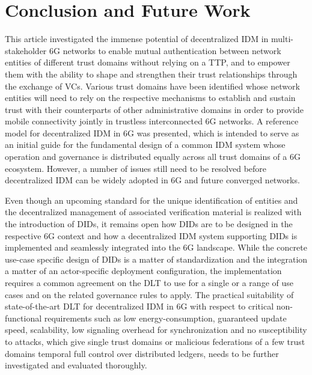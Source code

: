 \documentclass[conference]{IEEEtran}
\begin{document}
\section{Conclusion and Future Work}
\label{conclusion}

This article investigated the immense potential of decentralized IDM in multi-stakeholder 6G networks to enable mutual authentication between network entities of different trust domains without relying on a TTP, and to empower them with the ability to shape and strengthen their trust relationships through the exchange of VCs. Various trust domains have been identified whose network entities will need to rely on the respective mechanisms to establish and sustain trust with their counterparts of other administrative domains in order to provide mobile connectivity jointly in trustless interconnected 6G networks. A reference model for decentralized IDM in 6G was presented, which is intended to serve as an initial guide for the fundamental design of a common IDM system whose operation and governance is distributed equally across all trust domains of a 6G ecosystem. However, a number of issues still need to be resolved before decentralized IDM can be widely adopted in 6G and future converged networks. 

Even though an upcoming standard for the unique identification of entities and the decentralized management of associated verification material is realized with the introduction of DIDs, it remains open how DIDs are to be designed in the respective 6G context and how a decentralized IDM system supporting DIDs is implemented and seamlessly integrated into the 6G landscape. While the concrete use-case specific design of DIDs is a matter of standardization and the integration a matter of an actor-specific deployment configuration, the implementation requires a common agreement on the DLT to use for a single or a range of use cases and on the related governance rules to apply.  The practical suitability of state-of-the-art DLT for decentralized IDM in 6G with respect to critical non-functional requirements such as low energy-consumption, guaranteed update speed, scalability, low signaling overhead for synchronization and no susceptibility to attacks, which give single trust domains or malicious federations of a few trust domains temporal full control over distributed ledgers, needs to be further investigated and evaluated thoroughly. 

  
  
\end{document}
